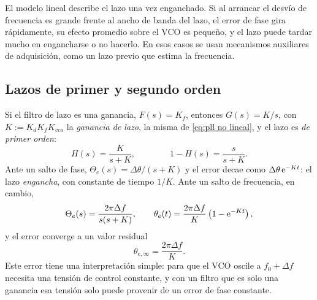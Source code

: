 El modelo lineal describe el lazo una vez enganchado. Si al arrancar el desvío de frecuencia es grande frente al ancho de banda del lazo, el error de fase gira rápidamente, su efecto promedio sobre el VCO es pequeño, y el lazo puede tardar mucho en engancharse o no hacerlo. En esos casos se usan mecanismos auxiliares de adquisición, como un lazo previo que estima la frecuencia.

\subsection{Lazos de primer y segundo orden}\label{sec:pll ordenes}

Si el filtro de lazo es una ganancia, $F(s)=K_f$, entonces $G(s)=K/s$, con $K:=K_dK_fK_{vco}$ la \emph{ganancia de lazo}, la misma de \eqref{eq:pll no lineal}, y el lazo es \emph{de primer orden}:
\begin{equation}\label{eq:pll primer orden}
    H(s) = \frac{K}{s+K}, \qquad\qquad 1-H(s) = \frac{s}{s+K}.
\end{equation}
Ante un salto de fase, $\Theta_e(s)=\Delta\theta/(s+K)$ y el error decae como $\Delta\theta\,\mathrm{e}^{-Kt}$: el lazo \emph{engancha}, con constante de tiempo $1/K$. Ante un salto de frecuencia, en cambio,
\begin{equation*}
    \Theta_e(s) = \frac{2\pi\Delta f}{s(s+K)}, \qquad \theta_e(t) = \frac{2\pi\Delta f}{K}\left(1-\mathrm{e}^{-Kt}\right),
\end{equation*}
y el error converge a un valor residual
\begin{equation}\label{eq:pll error regimen}
    \theta_{e,\infty} = \frac{2\pi\Delta f}{K}.
\end{equation}
Este error tiene una interpretación simple: para que el VCO oscile a $f_0+\Delta f$ necesita una tensión de control constante, y con un filtro que es solo una ganancia esa tensión solo puede provenir de un error de fase constante.


